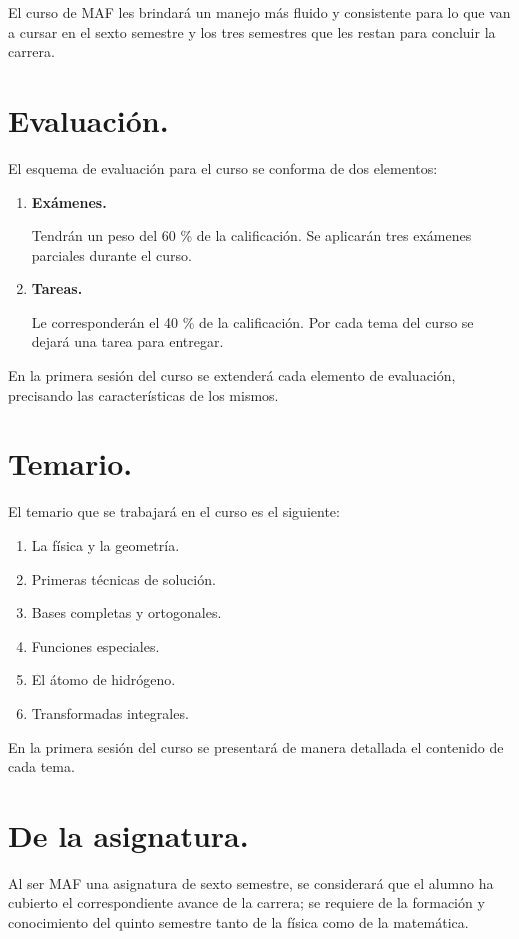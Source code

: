 \documentclass[14pt]{extarticle}
\numberwithin{equation}{section}
\begin{document}
El curso de MAF les brindará un manejo más fluido y consistente para lo que van a cursar en el sexto semestre y los tres semestres que les restan para concluir la carrera.

\section{Evaluación.}

El esquema de evaluación para el curso se conforma de dos elementos:
\begin{enumerate}[label=\alph*)]
\item \textbf{Exámenes.}

Tendrán un peso del \num{60} \% de la calificación. Se aplicarán tres exámenes parciales durante el curso.
\item \textbf{Tareas.}

Le corresponderán el \num{40} \% de la calificación. Por cada tema del curso se dejará una tarea para entregar.
\end{enumerate}
En la primera sesión del curso se extenderá cada elemento de evaluación, precisando las características de los mismos.

\newpage

\section{Temario.}

El temario que se trabajará en el curso es el siguiente:

\begin{enumerate}[label=Tema \arabic*., leftmargin=3\parindent]
\item La física y la geometría.
\item Primeras técnicas de solución.
\item Bases completas y ortogonales.
\item Funciones especiales.
\item El átomo de hidrógeno.
\item Transformadas integrales.
\end{enumerate}
En la primera sesión del curso se presentará de manera detallada el contenido de cada tema.

\section{De la asignatura.}

Al ser MAF una asignatura de sexto semestre, se considerará que el alumno ha cubierto el correspondiente avance de la carrera; se requiere de la formación y conocimiento del quinto semestre tanto de la física como de la matemática.
 
\end{document}
